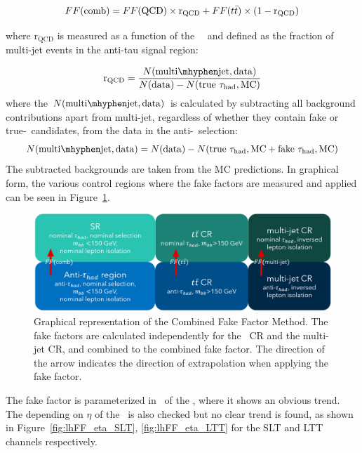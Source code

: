  \begin{equation}
 FF(\mathrm{comb}) = FF(\mathrm{QCD}) \times \mathrm{r}_{\mathrm{QCD}} + FF(t\bar{t}) \times (1 - \mathrm{r}_{\mathrm{QCD}}) 
 \end{equation} 
 
 where $\mathrm{r}_{\mathrm{QCD}}$ is measured as a function of the \tauhad\ \pT\ 
 and defined as the fraction of multi-jet events in the anti-tau signal region:
 
 \begin{equation}
 \mathrm{r}_{\mathrm{QCD}} = \frac{N(\mathrm{multi\mhyphen jet, data})} {N(\mathrm{data}) - N(\mathrm{true}~\tauhad, \mathrm{MC})}
 \end{equation} 
 where the $N(\mathrm{multi\mhyphen jet, data})$ is calculated by 
 subtracting all background contributions apart from multi-jet, 
 regardless of whether they contain fake or true-\tauhad\ candidates, 
 from the data in the anti-\tauhad\ selection:
 \begin{equation}
	 N(\mathrm{multi\mhyphen jet, data}) = N(\mathrm{data}) - N(\mathrm{true}~\tauhad, \mathrm{MC} + \mathrm{fake}~\tauhad, \mathrm{MC})
 \end{equation}  
 The subtracted backgrounds are taken from the MC predictions. 
 In graphical form, the various control regions 
 where the fake factors are measured and applied can be seen in Figure~\ref{fig:CombFFMethod}.
 \begin{figure}
 \centering
 \includegraphics[width=.9\textwidth]{DiHiggs/plots/FF regions.png}
 \caption{Graphical representation of the Combined Fake Factor Method. 
 The fake factors are calculated independently for the \ttbar\ CR and the multi-jet CR, and 
 combined to the combined fake factor. 
 The direction of the arrow indicates the direction 
 of extrapolation when applying the fake factor.}
 \label{fig:CombFFMethod}
 \end{figure}
The fake factor is parameterized in \pt\ of the \tauhad, where it shows an obvious trend.
The depending on $\eta$ of the \tauhad\ is also checked but no clear trend is found, as shown in 
Figure~\ref{fig:lhFF_eta_SLT}, \ref{fig:lhFF_eta_LTT} for the SLT and LTT channels respectively.  


